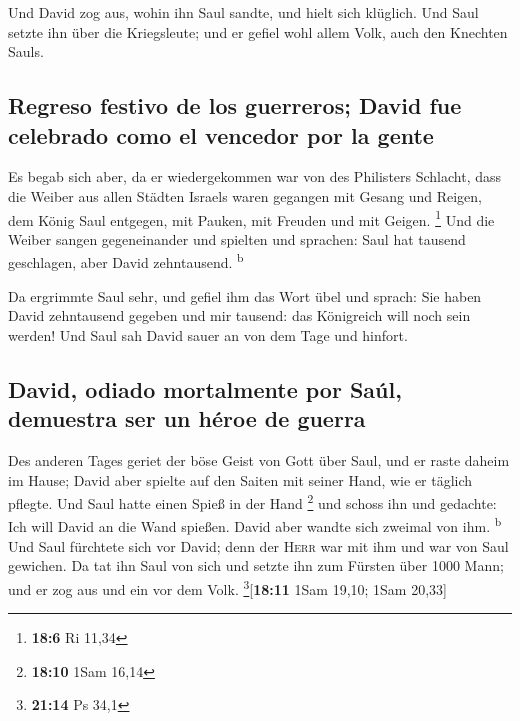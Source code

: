  Und David zog aus, wohin ihn Saul sandte, und hielt sich
klüglich. Und Saul setzte ihn über die Kriegsleute; und er gefiel wohl
allem Volk, auch den Knechten Sauls.

\hypertarget{regreso-festivo-de-los-guerreros-david-fue-celebrado-como-el-vencedor-por-la-gente}{%
\subsection{Regreso festivo de los guerreros; David fue celebrado como
el vencedor por la
gente}\label{regreso-festivo-de-los-guerreros-david-fue-celebrado-como-el-vencedor-por-la-gente}}

 Es begab sich aber, da er wiedergekommen war von des
Philisters Schlacht, dass die Weiber aus allen Städten Israels waren
gegangen mit Gesang und Reigen, dem König Saul entgegen, mit Pauken, mit
Freuden und mit Geigen. \footnote{\textbf{18:6} Ri 11,34} 
Und die Weiber sangen gegeneinander und spielten und sprachen: Saul hat
tausend geschlagen, aber David zehntausend. \textsuperscript{b}

 Da ergrimmte Saul sehr, und gefiel ihm das Wort übel und
sprach: Sie haben David zehntausend gegeben und mir tausend: das
Königreich will noch sein werden!  Und Saul sah David
sauer an von dem Tage und hinfort.

\hypertarget{david-odiado-mortalmente-por-sauxfal-demuestra-ser-un-huxe9roe-de-guerra}{%
\subsection{David, odiado mortalmente por Saúl, demuestra ser un héroe
de
guerra}\label{david-odiado-mortalmente-por-sauxfal-demuestra-ser-un-huxe9roe-de-guerra}}

 Des anderen Tages geriet der böse Geist von Gott über
Saul, und er raste daheim im Hause; David aber spielte auf den Saiten
mit seiner Hand, wie er täglich pflegte. Und Saul hatte einen Spieß in
der Hand \footnote{\textbf{18:10} 1Sam 16,14}  und schoss
ihn und gedachte: Ich will David an die Wand spießen. David aber wandte
sich zweimal von ihm. \textsuperscript{b}  Und Saul
fürchtete sich vor David; denn der \textsc{Herr} war mit ihm und war von
Saul gewichen.  Da tat ihn Saul von sich und setzte ihn
zum Fürsten über 1000 Mann; und er zog aus und ein vor dem Volk.
\footnote{\textbf{21:14} Ps 34,1}{[}\textbf{18:11} 1Sam 19,10; 1Sam
20,33{]}

